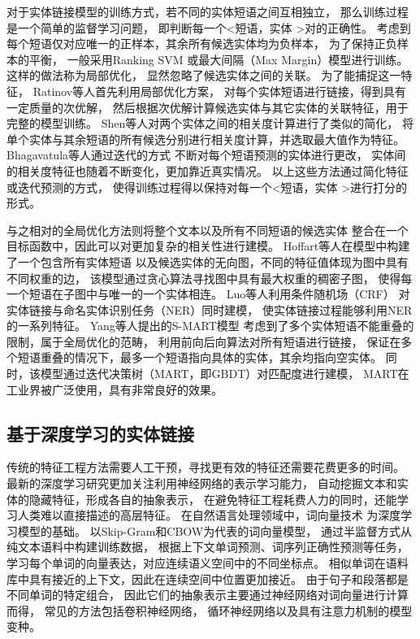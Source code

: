 对于实体链接模型的训练方式，若不同的实体短语之间互相独立，
那么训练过程是一个简单的监督学习问题，
即判断每一个\textless 短语，实体 \textgreater 对的正确性。
考虑到每个短语仅对应唯一的正样本，其余所有候选实体均为负样本，
为了保持正负样本的平衡，
一般采用Ranking SVM\cite{joachims2002optimizing}
或最大间隔（Max Margin）模型进行训练。
这样的做法称为局部优化，
显然忽略了候选实体之间的关联。
为了能捕捉这一特征，%
Ratinov等人\cite{ratinov2011local}首先利用局部优化方案，
对每个实体短语进行链接，得到具有一定质量的次优解，
然后根据次优解计算候选实体与其它实体的关联特征，用于完整的模型训练。
Shen等人\cite{shen2012linden}对两个实体之间的相关度计算进行了类似的简化，
将单个实体与其余短语的所有候选分别进行相关度计算，并选取最大值作为特征。
Bhagavatula等人\cite{bhagavatula2015tabel}通过迭代的方式
不断对每个短语预测的实体进行更改，
实体间的相关度特征也随着不断变化，更加靠近真实情况。
以上这些方法通过简化特征或迭代预测的方式，
使得训练过程得以保持对每一个\textless 短语，实体 \textgreater 进行打分的形式。

与之相对的全局优化方法则将整个文本以及所有不同短语的候选实体
整合在一个目标函数中，因此可以对更加复杂的相关性进行建模。
Hoffart等人\cite{hoffart2011robust}在模型中构建了一个包含所有实体短语
以及候选实体的无向图，不同的特征值体现为图中具有不同权重的边，
该模型通过贪心算法寻找图中具有最大权重的稠密子图，
使得每一个短语在子图中与唯一的一个实体相连。
Luo等人\cite{luo2015joint}利用条件随机场（CRF）
对实体链接与命名实体识别任务（NER）同时建模，
使实体链接过程能够利用NER的一系列特征。
Yang等人\cite{yang2015s}提出的S-MART模型
考虑到了多个实体短语不能重叠的限制，属于全局优化的范畴，
利用前向后向算法对所有短语进行链接，
保证在多个短语重叠的情况下，最多一个短语指向具体的实体，其余均指向空实体。
同时，该模型通过迭代决策树（MART，即GBDT）对匹配度进行建模，
MART在工业界被广泛使用，具有非常良好的效果。


\subsection{基于深度学习的实体链接}

传统的特征工程方法需要人工干预，寻找更有效的特征还需要花费更多的时间。
最新的深度学习研究更加关注利用神经网络的表示学习能力，
自动挖掘文本和实体的隐藏特征，形成各自的抽象表示，
在避免特征工程耗费人力的同时，还能学习人类难以直接描述的高层特征。
在自然语言处理领域中，词向量技术
\cite{mikolov2013distributed,pennington2014glove,mikolov2013exploiting}
为深度学习模型的基础。
以Skip-Gram和CBOW\cite{mikolov2013exploiting}为代表的词向量模型，
通过半监督方式从纯文本语料中构建训练数据，
根据上下文单词预测、词序列正确性预测等任务，
学习每个单词的向量表达，对应连续语义空间中的不同坐标点。
相似单词在语料库中具有接近的上下文，因此在连续空间中位置更加接近。
由于句子和段落都是不同单词的特定组合，
因此它们的抽象表示主要通过神经网络对词向量进行计算而得，
常见的方法包括卷积神经网络\cite{xu2015semantic}，
循环神经网络\cite{xu2015classifying}以及具有注意力机制\cite{bahdanau2014neural}的模型变种。

